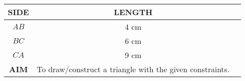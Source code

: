 \begin{tabular}[12pt]{|c|c|c|}
    \hline
    \textbf{SIDE} & \textbf{LENGTH} \\ 
    \hline
		$AB$ & 4 cm  \\
    \hline 
		$BC$ & 6 cm \\
    \hline
		$CA$ & 9 cm  \\
    \hline   
    \textbf{AIM} & To draw/construct a triangle with the given constraints. \\
    \hline
\end{tabular}

